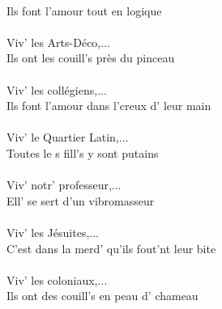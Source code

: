 \\Ils font l'amour tout en logique
\\\\Viv' les Arts-Déco,...
\\Ils ont les couill's près du pinceau
\\\\Viv' les collégiens,...
\\Ils font l'amour dans l'creux d' leur main
\\\\Viv' le Quartier Latin,...
\\Toutes le s fill's y sont putains
\\\\Viv' notr' professeur,...
\\Ell' se sert d'un vibromasseur
\\\\Viv' les Jésuites,...
\\C'est dans la merd' qu'ils fout'nt leur bite
\\\\Viv' les coloniaux,...
\\Ils ont des couill's en peau d' chameau

\breakpage